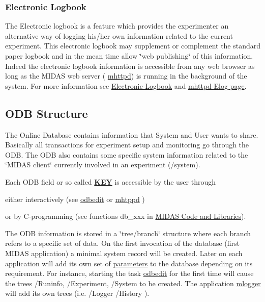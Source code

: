 \label{F_MainElements_idx_Elog_overview}
\hypertarget{F_MainElements_idx_Elog_overview}{}
 \hypertarget{F_MainElements_F_Electronic_Logbook_overview}{}\subsubsection{Electronic Logbook}\label{F_MainElements_F_Electronic_Logbook_overview}
The Electronic logbook is a feature which provides the experimenter an alternative way of logging his/her own information related to the current experiment. This electronic logbook may supplement or complement the standard paper logbook and in the mean time allow \char`\"{}web publishing\char`\"{} of this information. Indeed the electronic logbook information is accessible from any web browser as long as the MIDAS web server ( \hyperlink{RC_mhttpd_utility}{mhttpd}) is running in the background of the system. For more information see \hyperlink{F_Elog}{Electronic Logbook} and \hyperlink{RC_mhttpd_Elog_page}{mhttpd Elog page}.



\label{index_end}
\hypertarget{index_end}{}
 \subsection{ODB Structure}\label{F_ODB_Structure}
\label{F_ODB_Structure_idx_ODB_structure}
\hypertarget{F_ODB_Structure_idx_ODB_structure}{}
 

\par
 The Online Database contains information that System and User wants to share. Basically all transactions for experiment setup and monitoring go through the ODB. The ODB also contains some specific system information related to the \char`\"{}MIDAS client\char`\"{} currently involved in an experiment (/system).

Each ODB field or so called {\bfseries \hyperlink{structKEY}{KEY}} is accessible by the user through
\begin{DoxyItemize}
\item either interactively (see \hyperlink{RC_odbedit_utility}{odbedit} or \hyperlink{RC_mhttpd_utility}{mhtppd} )
\item or by C-\/programming (see functions db\_\-xxx in \hyperlink{F_Midas_Code_and_Libraries_F_Midas_Library}{MIDAS Code and Libraries}).
\end{DoxyItemize}

The ODB information is stored in a \char`\"{}tree/branch\char`\"{} structure where each branch refers to a specific set of data. On the first invocation of the database (first MIDAS application) a minimal system record will be created. Later on each application will add its own set of \hyperlink{structparameters}{parameters} to the database depending on its requirement. For instance, starting the task \hyperlink{RC_odbedit_utility}{odbedit} for the first time will cause the trees /Runinfo, /Experiment, /System to be created. The application \hyperlink{F_Logging_F_mlogger_utility}{mlogger} will add its own trees (i.e.  /Logger /History ).

